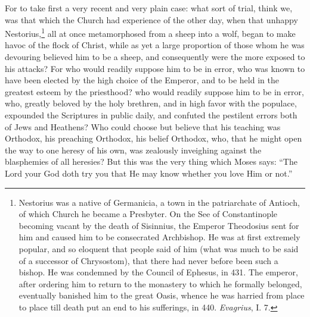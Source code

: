 For to take first a very recent and very plain case: what sort of trial, think we, was that which the Church had experience of the other day, when that unhappy Nestorius,\footnote{Nestorius was a native of Germanicia, a town in the patriarchate of Antioch, of which Church he became a Presbyter. On the See of Constantinople becoming vacant by the death of Sisinnius, the Emperor Theodosius sent for him and caused him to be consecrated Archbishop. He was at first extremely popular, and so eloquent that people said of him (what was much to be said of a successor of Chrysostom), that there had never before been such a bishop. He was condemned by the Council of Ephesus, in 431. The emperor, after ordering him to return to the monastery to which he formally belonged, eventually banished him to the great Oasis, whence he was harried from place to place till death put an end to his sufferings, in 440. \emph{Evagrius}, I. 7.} all at once metamorphosed from a sheep into a wolf, began to make havoc of the flock of Christ, while as yet a large proportion of those whom he was devouring believed him to be a sheep, and consequently were the more exposed to his attacks? For who would readily suppose him to be in error, who was known to have been elected by the high choice of the Emperor, and to be held in the greatest esteem by the priesthood? who would readily suppose him to be in error, who, greatly beloved by the holy brethren, and in high favor with the populace, expounded the Scriptures in public daily, and confuted the pestilent errors both of Jews and Heathens? Who could choose but believe that his teaching was Orthodox, his preaching Orthodox, his belief Orthodox, who, that he might open the way to one heresy of his own, was zealously inveighing against the blasphemies of all heresies? But this was the very thing which Moses says: “The Lord your God doth try you that He may know whether you love Him or not.”

